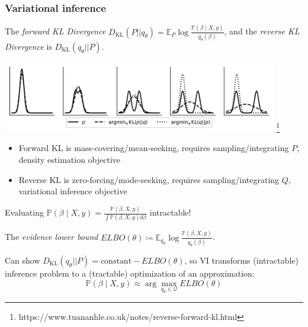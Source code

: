 \documentclass{beamer}
\newcommand{\EE}{\mathbb{E}}
\newcommand{\PP}{\mathbb{P}}
\newcommand{\cQ}{\mathcal{Q}}
\newcommand{\KLD}[2]{D_{\mathrm{KL}}\left( #1||#2\right)}
\begin{document}
\begin{frame}[allowframebreaks]
    \frametitle{Variational inference}

    \begin{definition}
        The \emph{forward KL Divergence}
        $\KLD{P}{q_\theta} = \EE_P \log \frac{\PP(\beta \mid X, y)}{q_\theta(\beta)}$,
        and the \emph{reverse KL Divergence} is $\KLD{q_\theta}{P}$.
    \end{definition}

    \begin{center}
        \includegraphics[width=0.9\textwidth]{Figures/reverse_forward_kl.png}
        \footnote{https://www.tuananhle.co.uk/notes/reverse-forward-kl.html}
    \end{center}

    \begin{itemize}
        \item Forward KL is mass-covering/mean-seeking,
              requires sampling/integrating $P$,
              density estimation objective
        \item Reverse KL is zero-forcing/mode-seeking,
              requires sampling/integrating $Q$,
              variational inference objective
    \end{itemize}

    \framebreak

    Evaluating $\PP(\beta \mid X, y) = \frac{\PP(\beta, X, y)}{\int \PP(\beta, X, y) d\beta}$ intractable!

    \begin{definition}
        The \emph{evidence lower bound}
        $ELBO(\theta) \coloneqq \EE_{q_\theta} \log \frac{\PP(\beta, X, y)}{q_\theta(\beta)}$.
    \end{definition}

    Can show $\KLD{q_\theta}{P} = \text{constant} - ELBO(\theta)$, so VI transforms
    (intractable) inference problem to a (tractable) optimization of an approximation:
    \[
        \PP(\beta \mid X, y) \approx \arg\max_{q_\theta \in \cQ} ELBO(\theta)
    \]
\end{frame}
\end{document}
